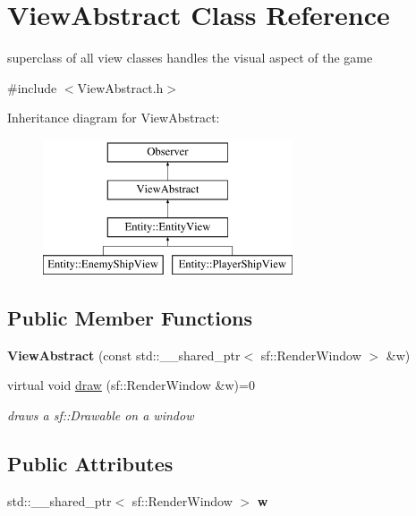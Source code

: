 \hypertarget{classViewAbstract}{}\section{View\+Abstract Class Reference}
\label{classViewAbstract}


superclass of all view classes handles the visual aspect of the game  




{\ttfamily \#include $<$View\+Abstract.\+h$>$}

Inheritance diagram for View\+Abstract\+:\begin{figure}[H]
\begin{center}
\leavevmode
\includegraphics[height=4.000000cm]{classViewAbstract}
\end{center}
\end{figure}
\subsection*{Public Member Functions}
\begin{DoxyCompactItemize}
\item 
\mbox{\label{classViewAbstract_ae70e54b453832e601f5332fefb6f4c74}} 
{\bfseries View\+Abstract} (const std\+::\+\_\+\+\_\+shared\+\_\+ptr$<$ sf\+::\+Render\+Window $>$ \&w)
\item 
virtual void \hyperlink{classViewAbstract_ab9d21012b19948e704a800da39b232ba}{draw} (sf\+::\+Render\+Window \&w)=0
\begin{DoxyCompactList}\small\item\em draws a sf\+::\+Drawable on a window \end{DoxyCompactList}\end{DoxyCompactItemize}
\subsection*{Public Attributes}
\begin{DoxyCompactItemize}
\item 
\mbox{\label{classViewAbstract_a51b1f37a6113ef3f7b061db29cb4a4c0}} 
std\+::\+\_\+\+\_\+shared\+\_\+ptr$<$ sf\+::\+Render\+Window $>$ {\bfseries w}
\end{DoxyCompactItemize}


